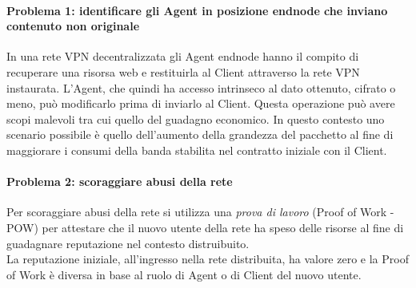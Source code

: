 \documentclass[]{article}
\begin{document}
		\paragraph{Problema 1: identificare gli Agent in posizione endnode che inviano contenuto non originale}
			In una rete VPN decentralizzata gli Agent endnode hanno il compito di recuperare una risorsa web e restituirla al Client attraverso la rete VPN instaurata. L'Agent, che quindi ha accesso intrinseco al dato ottenuto, cifrato o meno, può modificarlo prima di inviarlo al Client. Questa operazione può avere scopi malevoli tra cui quello del guadagno economico. In questo contesto uno scenario possibile è quello dell'aumento della grandezza del pacchetto al fine di maggiorare i consumi della banda stabilita nel contratto iniziale con il Client.
		 	
		\paragraph{Problema 2: scoraggiare abusi della rete}
			Per scoraggiare abusi della rete si utilizza una \textit{prova di lavoro} (Proof of Work - POW) per attestare che il nuovo utente della rete ha speso delle risorse al fine di guadagnare reputazione nel contesto distruibuito.\\
			La reputazione iniziale, all'ingresso nella rete distribuita, ha valore zero e la Proof of Work è diversa in base al ruolo di Agent o di Client del nuovo utente.
			
\end{document}
